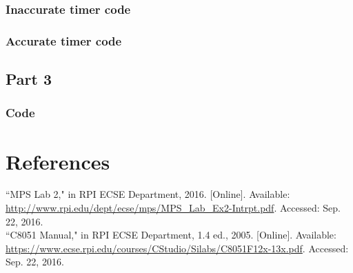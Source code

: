 \documentclass[12pt]{article}
\begin{document}
	\subsubsection{Inaccurate timer code}
		
	\subsubsection{Accurate timer code}
				

\subsection{Part 3}
	\subsubsection{Code}
		
	
	
\section{References} 
\noindent
``MPS Lab 2," in RPI ECSE Department, 2016. [Online]. Available: \url{http://www.rpi.edu/dept/ecse/mps/MPS_Lab_Ex2-Intrpt.pdf}. Accessed: Sep. 22, 2016.\\
\newline\noindent
``C8051 Manual," in RPI ECSE Department, 1.4 ed., 2005. [Online]. Available: \url{https://www.ecse.rpi.edu/courses/CStudio/Silabs/C8051F12x-13x.pdf}. Accessed: Sep. 22, 2016.
\end{document}
